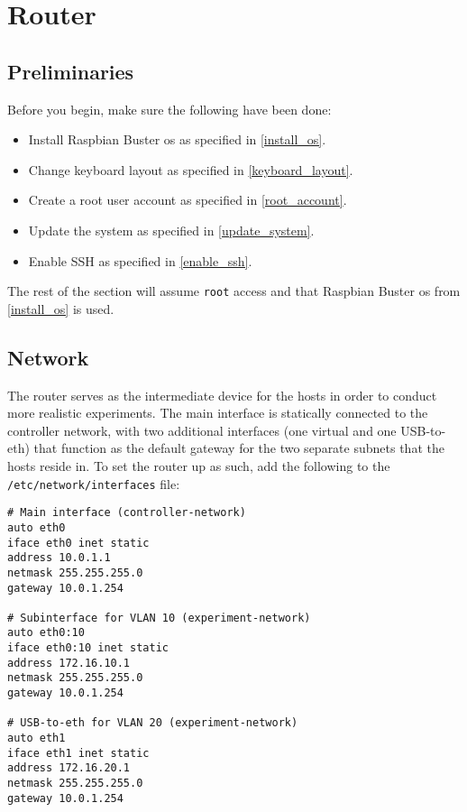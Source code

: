 \chapter{Router}


\section{Preliminaries}

Before you begin, make sure the following have been done:

\begin{itemize}
    \item Install Raspbian Buster \gls{os} as specified in \ref{install_os}.
    \item Change keyboard layout as specified in \ref{keyboard_layout}.
    \item Create a root user account as specified in \ref{root_account}.
    \item Update the system as specified in \ref{update_system}.
    \item Enable SSH as specified in \ref{enable_ssh}.
\end{itemize}

The rest of the section will assume \lstinline{root} access and that Raspbian Buster \gls{os} from \ref{install_os} is used.


\section{Network}

The router serves as the intermediate device for the hosts in order to conduct more realistic experiments. The main interface is statically connected to the controller network, with two additional interfaces (one virtual and one USB-to-eth) that function as the default gateway for the two separate subnets that the hosts reside in. To set the router up as such, add the following to the \lstinline{/etc/network/interfaces} file:

\begin{lstlisting}
# Main interface (controller-network)
auto eth0
iface eth0 inet static
address 10.0.1.1
netmask 255.255.255.0
gateway 10.0.1.254

# Subinterface for VLAN 10 (experiment-network)
auto eth0:10
iface eth0:10 inet static
address 172.16.10.1
netmask 255.255.255.0
gateway 10.0.1.254

# USB-to-eth for VLAN 20 (experiment-network)
auto eth1
iface eth1 inet static
address 172.16.20.1
netmask 255.255.255.0
gateway 10.0.1.254
\end{lstlisting}

